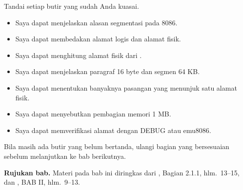 \begin{checklistbox}
\vspace{1.1em}
Tandai setiap butir yang sudah Anda kuasai.

\begin{itemize}
    \item[\checkbox] Saya dapat menjelaskan alasan segmentasi pada
          8086.
    \item[\checkbox] Saya dapat membedakan alamat logis dan alamat
          fisik.
    \item[\checkbox] Saya dapat menghitung alamat fisik dari
          .
    \item[\checkbox] Saya dapat menjelaskan paragraf 16 byte dan
          segmen 64 KB.
    \item[\checkbox] Saya dapat menentukan banyaknya pasangan yang
          menunjuk satu alamat fisik.
    \item[\checkbox] Saya dapat menyebutkan pembagian memori 1 MB.
    \item[\checkbox] Saya dapat memverifikasi alamat dengan DEBUG
          atau emu8086.
\end{itemize}

\vspace{0.4em}
Bila masih ada butir yang belum bertanda, ulangi bagian yang
bersesuaian sebelum melanjutkan ke bab berikutnya.
\end{checklistbox}

\begin{infobox}
\vspace{1.1em}
\textbf{Rujukan bab.} Materi pada bab ini diringkas dari
\cite{gunawan2019}, Bagian 2.1.1, hlm.~13--15, dan \cite{sto2001},
BAB II, hlm.~9--13.
\end{infobox}
